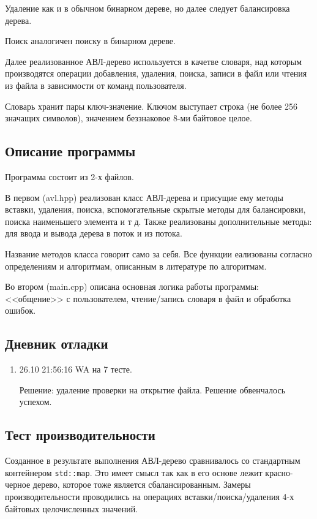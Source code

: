 \documentclass[12pt]{article}
\begin{document}
	Удаление как и в обычном бинарном дереве, но далее следует балансировка дерева.
	
	Поиск аналогичен поиску в бинарном дереве.
	
	Далее реализованное АВЛ-дерево используется в качетве словаря, над которым производятся операции добавления, удаления, поиска, записи в файл или чтения из файла в зависимости от команд пользователя.
	
	Словарь хранит пары ключ-значение. Ключом выступает строка (не более 256 значащих символов), значением беззнаковое 8-ми байтовое целое.
	
	\subsection*{Описание программы}
	
	Программа состоит из 2-х файлов. 
	
	В первом (avl.hpp) реализован класс АВЛ-дерева и присущие ему методы вставки, удаления, поиска, вспомогательные скрытые методы для балансировки, поиска наименьшего элемента и т д. Также реализованы дополнительные методы: для ввода и вывода дерева в поток и из потока.
	
	Название методов класса говорит само за себя. Все функции еализованы согласно определениям и алгоритмам, описанным в литературе по алгоритмам.
	
	Во втором (main.cpp) описана основная логика работы программы: <<общение>> с пользователем, чтение/запись словаря в файл и обработка ошибок.
	
	\subsection*{Дневник отладки}
	
	\begin{enumerate}
		\item 26.10 21:56:16 WA на 7 тесте.
		
		Решение: удаление проверки на открытие файла. Решение обвенчалось успехом.
		
	\end{enumerate}
	
	\subsection*{Тест производительности}
	
	Созданное в результате выполнения АВЛ-дерево сравнивалось со стандартным контейнером \verb|std::map|. Это имеет смысл так как в его основе лежит красно-черное дерево, которое тоже является сбалансированным.
	Замеры производительности проводились на операциях вставки/поиска/удаления 4-х байтовых целочисленных значений.  
	
\end{document}
